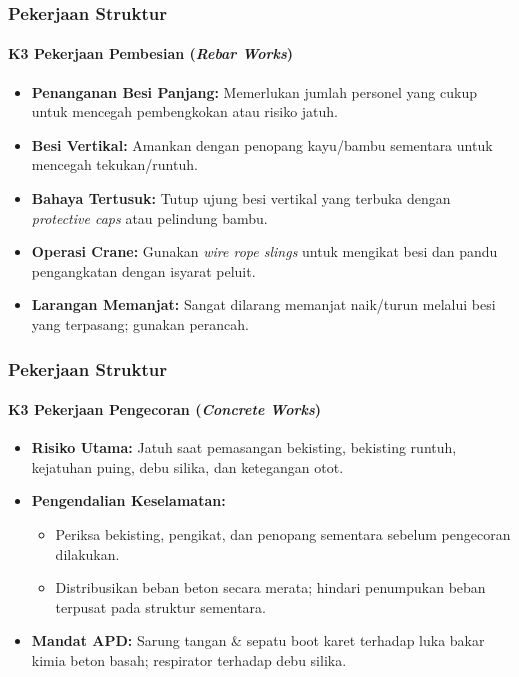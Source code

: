 \documentclass[../main.tex]{subfiles}
\begin{document}
\begin{frame}[mytitle=standard,t,mycolor=digiPH_cream,light]
	\frametitle{Pekerjaan Struktur}
	\framesubtitle{K3 Pekerjaan Pembesian (\textit{Rebar Works})}
	\begin{itemize}
		\item \textbf{Penanganan Besi Panjang:} Memerlukan jumlah personel yang cukup untuk mencegah pembengkokan atau risiko jatuh.
		\item \textbf{Besi Vertikal:} Amankan dengan penopang kayu/bambu sementara untuk mencegah tekukan/runtuh.
		\item \textbf{Bahaya Tertusuk:} Tutup ujung besi vertikal yang terbuka dengan \textit{protective caps} atau pelindung bambu.
		\item \textbf{Operasi Crane:} Gunakan \textit{wire rope slings} untuk mengikat besi dan pandu pengangkatan dengan isyarat peluit.
		\item \textbf{Larangan Memanjat:} Sangat dilarang memanjat naik/turun melalui besi yang terpasang; gunakan perancah.
	\end{itemize}
\end{frame}

\begin{frame}[mytitle=center,t,mycolor=white,light]
	\frametitle{Pekerjaan Struktur}
	\framesubtitle{K3 Pekerjaan Pengecoran (\textit{Concrete Works})}
	\begin{itemize}
		\item \textbf{Risiko Utama:} Jatuh saat pemasangan bekisting, bekisting runtuh, kejatuhan puing, debu silika, dan ketegangan otot.
		\item \textbf{Pengendalian Keselamatan:}
		      \begin{itemize}
			      \item Periksa bekisting, pengikat, dan penopang sementara sebelum pengecoran dilakukan.
			      \item Distribusikan beban beton secara merata; hindari penumpukan beban terpusat pada struktur sementara.
		      \end{itemize}
		\item \textbf{Mandat APD:} Sarung tangan \& sepatu boot karet terhadap luka bakar kimia beton basah; respirator terhadap debu silika.
	\end{itemize}
\end{frame}
\end{document}
